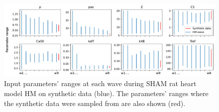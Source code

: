 \begin{figure}[ht!]
    \myfloatalign
    \includegraphics[width=1\textwidth]{figures/chapterA/hm_vs_synt_data_parameters.pdf}
    \caption{Input parameters' ranges at each wave during SHAM rat heart model HM on synthetic data (blue). The parameters' ranges where the synthetic data were sampled from are also shown (red).}
    \label{fig:syntintmatch}
\end{figure}

